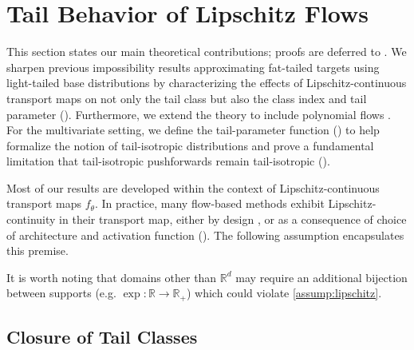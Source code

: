 \documentclass[nohyperref]{article}
\theoremstyle{plain}
\theoremstyle{definition}
\newtheorem{assumption}[theorem]{Assumption}
\theoremstyle{remark}
\begin{document}
\section{Tail Behavior of Lipschitz Flows}

\vspace{-1mm}
This section states our main theoretical contributions; proofs are deferred to .
We sharpen previous impossibility results approximating fat-tailed targets
using light-tailed base distributions \citep[Theorem 4]{jaini2020tails}
by characterizing the effects of Lipschitz-continuous transport maps on not only the tail class
but also the class index and tail parameter (). Furthermore, we extend the theory
to include polynomial flows \citep{jaini2019sum}. For the multivariate setting,
we define the tail-parameter function () to help formalize the notion
of tail-isotropic distributions and prove a fundamental limitation that tail-isotropic
pushforwards remain tail-isotropic ().

Most of our results are developed within the context of Lipschitz-continuous transport maps $f_\theta$.
In practice, many flow-based methods exhibit Lipschitz-continuity in their transport map, either by design \citep{grathwohl2018ffjord,chen2019residual}, or as a consequence of choice of architecture and activation function (). %
%
The following assumption encapsulates this premise.
It is worth noting that domains other than $\mathbb{R}^d$ may require an additional bijection between supports (e.g. $\exp : \mathbb{R} \to \mathbb{R}_+$) which
could violate \cref{assump:lipschitz}.

\vspace{-2mm}
\subsection{Closure of Tail Classes}
\label{ssec:failure}
\end{document}
